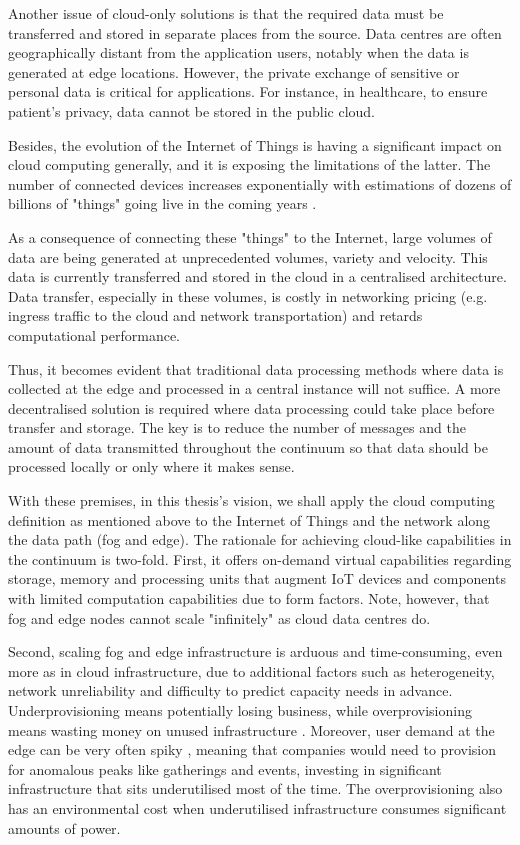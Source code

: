 Another issue of cloud-only solutions is that the required data must be transferred and stored in separate places from the source. Data centres are often geographically distant from the application users, notably when the data is generated at edge locations. However, the private exchange of sensitive or personal data is critical for applications. For instance, in healthcare, to ensure patient's privacy, data cannot be stored in the public cloud.

Besides, the evolution of the Internet of Things is having a significant impact on cloud computing generally, and it is exposing the limitations of the latter. The number of connected devices increases exponentially with estimations of dozens of billions of "things" going live in the coming years \cite{gartner-iot}.

As a consequence of connecting these "things" to the Internet, large volumes of data are being generated at unprecedented volumes, variety and velocity. This data is currently transferred and stored in the cloud in a centralised architecture. Data transfer, especially in these volumes, is costly in networking pricing (e.g. ingress traffic to the cloud and network transportation) and retards computational performance.

Thus, it becomes evident that traditional data processing methods where data is collected at the edge and processed in a central instance will not suffice. A more decentralised solution is required where data processing could take place before transfer and storage. The key is to reduce the number of messages and the amount of data transmitted throughout the continuum so that data should be processed locally or only where it makes sense.

With these premises, in this thesis's vision, we shall apply the cloud computing definition as mentioned above to the Internet of Things and the network along the data path (fog and edge). The rationale for achieving cloud-like capabilities in the continuum is two-fold. First, it offers on-demand virtual capabilities regarding storage, memory and processing units that augment IoT devices and components with limited computation capabilities due to form factors. Note, however, that fog and edge nodes cannot scale "infinitely" as cloud data centres do.

Second, scaling fog and edge infrastructure is arduous and time-consuming, even more as in cloud infrastructure, due to additional factors such as heterogeneity, network unreliability and difficulty to predict capacity needs in advance. Underprovisioning means potentially losing business, while overprovisioning means wasting money on unused infrastructure \cite{nygren2010akamai}.  Moreover, user demand at the edge can be very often spiky \cite{nygren2010akamai}, meaning that companies would need to provision for anomalous peaks like gatherings and events, investing in significant infrastructure that sits underutilised most of the time. The overprovisioning also has an environmental cost when underutilised infrastructure consumes significant amounts of power.


